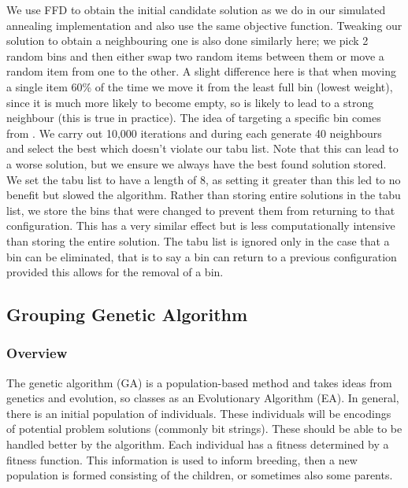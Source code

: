 \documentclass[12pt]{article}
\begin{document}
We use FFD to obtain the initial candidate solution as we do in our simulated annealing implementation and also use the same objective function. Tweaking our solution to obtain a neighbouring one is also done similarly here; we pick 2 random bins and then either swap two random items between them or move a random item from one to the other. A slight difference here is that when moving a single item 60\% of the time we move it from the least full bin (lowest weight), since it is much more likely to become empty, so is likely to lead to a strong neighbour (this is true in practice). The idea of targeting a specific bin comes from \cite{lodi}. We carry out 10,000 iterations and during each generate 40 neighbours and select the best which doesn’t violate our tabu list. Note that this can lead to a worse solution, but we ensure we always have the best found solution stored. We set the tabu list to have a length of 8, as setting it greater than this led to no benefit but slowed the algorithm. Rather than storing entire solutions in the tabu list, we store the bins that were changed to prevent them from returning to that configuration. This has a very similar effect but is less computationally intensive than storing the entire solution. The tabu list is ignored only in the case that a bin can be eliminated, that is to say a bin can return to a previous configuration provided this allows for the removal of a bin. 

\subsection{Grouping Genetic Algorithm}

\subsubsection{Overview}

The genetic algorithm (GA) is a population-based method and takes ideas from genetics and evolution, so classes as an Evolutionary Algorithm (EA). In general, there is an initial population of individuals. These individuals will be encodings of potential problem solutions (commonly bit strings). These should be able to be handled better by the algorithm. Each individual has a fitness determined by a fitness function. This information is used to inform breeding, then a new population is formed consisting of the children, or sometimes also some parents.  
\end{document}
